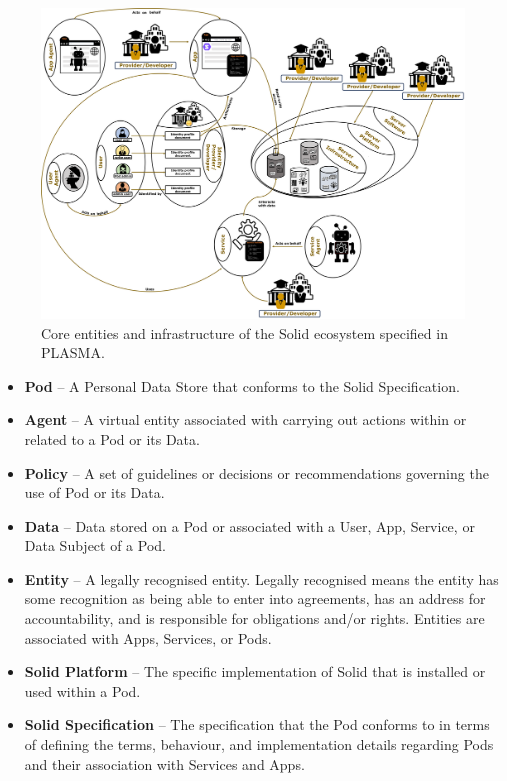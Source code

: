 \begin{landscape}
\begin{figure}[htbp]
    \centering
    \includegraphics[width=\linewidth]{figures/chapter-4/solid-infrastructure-actors.png}
    \caption{Core entities and infrastructure of the Solid ecosystem specified in PLASMA.}
    \label{fig:solid_plasma}
\end{figure}
\end{landscape}

\begin{itemize}
    \item \textbf{Pod} -- A Personal Data Store that conforms to the Solid Specification.
    \item \textbf{Agent} -- A virtual entity associated with carrying out actions within or related to a Pod or its Data.
    \item \textbf{Policy} -- A set of guidelines or decisions or recommendations governing the use of Pod or its Data.
    \item \textbf{Data} -- Data stored on a Pod or associated with a User, App, Service, or Data Subject of a Pod.
    \item \textbf{Entity} -- A legally recognised entity. Legally recognised means the entity has some recognition as being able to enter into agreements, has an address for accountability, and is responsible for obligations and/or rights. Entities are associated with Apps, Services, or Pods.
    \item \textbf{Solid Platform} -- The specific implementation of Solid that is installed or used within a Pod.
    \item \textbf{Solid Specification} -- The specification that the Pod conforms to in terms of defining the terms, behaviour, and implementation details regarding Pods and their association with Services and Apps.
\end{itemize}

